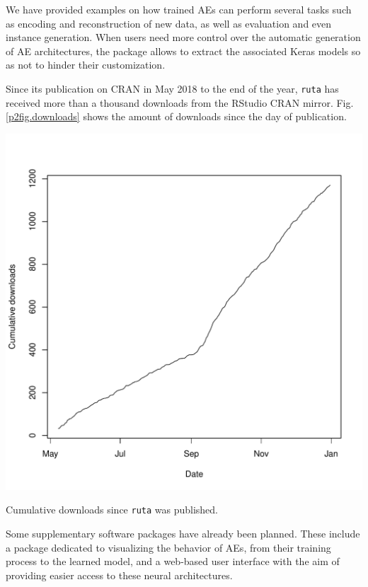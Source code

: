 We have provided examples on how trained AEs can perform several tasks such as encoding and reconstruction of new data, as well as evaluation and even instance generation. {When users need more control over the automatic generation of AE architectures, the package allows to extract the associated Keras models so as not to hinder their customization.}

{Since its publication on CRAN in May 2018 to the end of the year, \texttt{ruta} has received more than a thousand downloads from the RStudio CRAN mirror. Fig. \ref{p2fig.downloads} shows the amount of downloads since the day of publication.}

\begin{marginfigure}
  \centering
  \includegraphics[width=\textwidth]{ruta_downloads.pdf}
  \caption{\label{p2fig.downloads}Cumulative downloads since \texttt{ruta} was published.}
\end{marginfigure}

Some supplementary software packages have already been planned. These include a package dedicated to visualizing the behavior of AEs, from their training process to the learned model, and a web-based user interface with the aim of providing easier access to these neural architectures.


